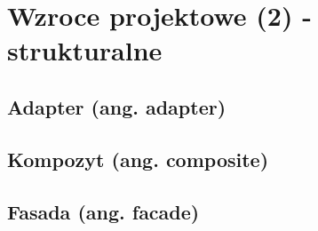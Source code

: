 \section{Wzroce projektowe (2) - strukturalne}
\subsection{Adapter (ang. adapter)}
\subsection{Kompozyt (ang. composite)}
\subsection{Fasada (ang. facade)}